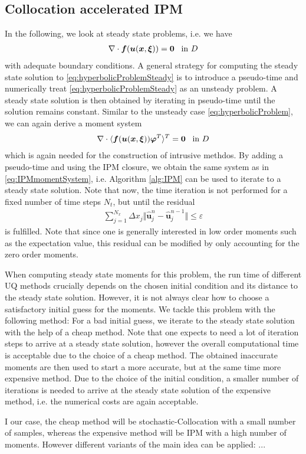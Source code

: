 \subsection{Collocation accelerated IPM}
\label{sec:collIPM}

In the following, we look at steady state problems, i.e. we have
\begin{align}\label{eq:hyperbolicProblemSteady}
\nabla\cdot\bm{f}(\bm{u}(\bm{x},\bm{\xi})) = \bm{0} \enskip \text{ in } D
\end{align}
with adequate boundary conditions. A general strategy for computing the steady state solution to \eqref{eq:hyperbolicProblemSteady} is to introduce a pseudo-time and numerically treat \eqref{eq:hyperbolicProblemSteady} as an unsteady problem. A steady state solution is then obtained by iterating in pseudo-time until the solution remains constant.
Similar to the unsteady case \eqref{eq:hyperbolicProblem}, we can again derive a moment system 
\begin{align}\label{eq:MomentSystemSteady}
\nabla\cdot\langle\bm{f}(\bm{u}(\bm{x},\bm{\xi}))\bm{\varphi}^T\rangle^T = \bm{0} \enskip \text{ in } D
\end{align}
which is again needed for the construction of intrusive methdos. By adding a pseudo-time and using the IPM closure, we obtain the same system as in \eqref{eq:IPMmomentSystem}, i.e. Algorithm \ref{alg:IPM} can be used to iterate to a steady state solution. Note that now, the time iteration is not performed for a fixed number of time steps $N_t$, but until the residual
\begin{align*}
\sum_{j = 1}^{N_x} \Delta x_j \Vert \bm{\hat{u}}_j^n - \bm{\hat{u}}_j^{n-1} \Vert \leq \varepsilon
\end{align*}
is fulfilled. Note that since one is generally interested in low order moments such as the expectation value, this residual can be modified by only accounting for the zero order moments.

When computing steady state moments for this problem, the run time of different UQ methods crucially depends on the chosen initial condition and its distance to the steady state solution. However, it is not always clear how to choose a satisfactory initial guess for the moments. We tackle this problem with the following method: For a bad initial guess, we iterate to the steady state solution with the help of a cheap method. Note that one expects to need a lot of iteration steps to arrive at a steady state solution, however the overall computational time is acceptable due to the choice of a cheap method. The obtained inaccurate moments are then used to start a more accurate, but at the same time more expensive method. Due to the choice of the initial condition, a smaller number of iterations is needed to arrive at the steady state solution of the expensive method, i.e. the numerical costs are again acceptable.

I our case, the cheap method will be stochastic-Collocation with a small number of samples, whereas the expensive method will be IPM with a high number of moments. However different variants of the main idea can be applied: ...